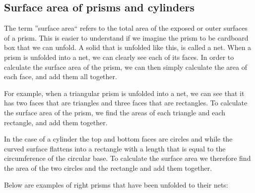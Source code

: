 \subsection{Surface area of prisms and cylinders}

 The term ''surface area`` refers to the total area of the exposed or outer surfaces of a prism.
This is easier to understand if we imagine the prism to be cardboard box that we can unfold.
A solid that is unfolded like this, is called a net. When a prism is unfolded into a net, we can clearly see each of its faces. In order to calculate the surface area of the prism, we can then simply calculate the area of each face, and add them all together.
\par 


 For example, when a triangular prism is unfolded into a net, we can see that it has two faces that are
triangles and three faces that are rectangles. To calculate the surface area of the prism, we find the areas of each triangle and  each rectangle, and add them together.
  \par
In the case of a cylinder the top and bottom faces are circles and while the curved surface flattens
into a rectangle with a length that is equal to the circumference of the circular base. To calculate the surface area we therefore find the area of the two circles and the rectangle and add them together.

\par
Below are examples of right prisms that have been unfolded to their nets:

